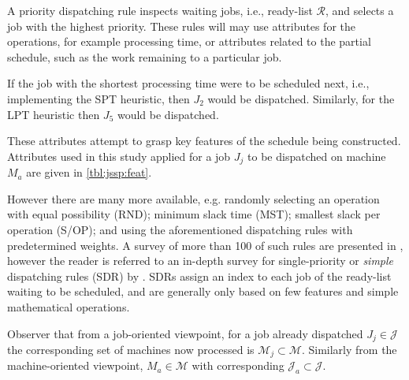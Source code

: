 \documentclass[smallextended]{svjour3}
\begin{document}
	A priority dispatching rule inspects waiting jobs, i.e., ready-list $\mathcal{R}$, and selects a job with the highest priority. These rules will may use attributes for the operations, for example processing time, or attributes related to the partial schedule, such as the work remaining to a particular job. 
	
	If the job with the shortest processing time were to be scheduled next, i.e., implementing the SPT heuristic, then $J_2$ would be dispatched. Similarly, for the LPT heuristic then $J_5$ would be dispatched. 
	
	
	
	These attributes attempt to grasp key features of the schedule being constructed. Attributes used in this study applied for a job $J_j$ to be dispatched on machine $M_a$ are given in \cref{tbl:jssp:feat}.  
	
	However there are many more available, e.g. randomly selecting an operation with equal possibility (RND); minimum slack time (MST); smallest slack per operation (S/OP); and using the aforementioned dispatching rules with predetermined weights. A survey of more than 100 of such rules are presented in \citet{Panwalkar77}, however the reader is referred to an in-depth survey for single-priority or \emph{simple} dispatching rules (SDR) by \citet{Haupt89}. 
	SDRs assign an index to each job of the ready-list waiting to be scheduled, and are generally only based on few features and simple mathematical operations. 
	
	
	
	Observer that from a job-oriented viewpoint, for a job already dispatched $J_j\in\mathcal{J}$ the corresponding set of machines now processed is $\mathcal{M}_j\subset\mathcal{M}$. Similarly from the machine-oriented viewpoint, $M_a\in\mathcal{M}$ with corresponding $\mathcal{J}_a\subset\mathcal{J}$. 
	
	
	
	
	
\end{document}
